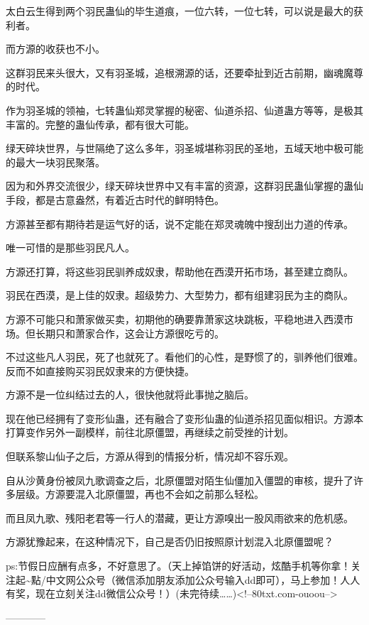 \begin{this_body}
太白云生得到两个羽民蛊仙的毕生道痕，一位六转，一位七转，可以说是最大的获利者。

而方源的收获也不小。

这群羽民来头很大，又有羽圣城，追根溯源的话，还要牵扯到近古前期，幽魂魔尊的时代。

作为羽圣城的领袖，七转蛊仙郑灵掌握的秘密、仙道杀招、仙道蛊方等等，是极其丰富的。完整的蛊仙传承，都有很大可能。

绿天碎块世界，与世隔绝了这么多年，羽圣城堪称羽民的圣地，五域天地中极可能的最大一块羽民聚落。

因为和外界交流很少，绿天碎块世界中又有丰富的资源，这群羽民蛊仙掌握的蛊仙手段，都是古意盎然，有着近古时代的鲜明特色。

方源甚至都有期待若是运气好的话，说不定能在郑灵魂魄中搜刮出力道的传承。

唯一可惜的是那些羽民凡人。

方源还打算，将这些羽民驯养成奴隶，帮助他在西漠开拓市场，甚至建立商队。

羽民在西漠，是上佳的奴隶。超级势力、大型势力，都有组建羽民为主的商队。

方源不可能只和萧家做买卖，初期他的确要靠萧家这块跳板，平稳地进入西漠市场。但长期只和萧家合作，这会让方源很吃亏的。

不过这些凡人羽民，死了也就死了。看他们的心性，是野惯了的，驯养他们很难。反而不如直接购买羽民奴隶来的方便快捷。

方源不是一位纠结过去的人，很快他就将此事抛之脑后。

现在他已经拥有了变形仙蛊，还有融合了变形仙蛊的仙道杀招见面似相识。方源本打算变作另外一副模样，前往北原僵盟，再继续之前受挫的计划。

但联系黎山仙子之后，方源从得到的情报分析，情况却不容乐观。

自从沙黄身份被凤九歌调查之后，北原僵盟对陌生仙僵加入僵盟的审核，提升了许多层级。方源要混入北原僵盟，再也不会如之前那么轻松。

而且凤九歌、残阳老君等一行人的潜藏，更让方源嗅出一股风雨欲来的危机感。

方源犹豫起来，在这种情况下，自己是否仍旧按照原计划混入北原僵盟呢？

ps:节假日应酬有点多，不好意思了。（天上掉馅饼的好活动，炫酷手机等你拿！关注起\~{}點/中文网公众号（微信添加朋友添加公众号输入dd即可），马上参加！人人有奖，现在立刻关注dd微信公众号！）(未完待续……)<!--80txt.com-ouoou-->

------------

\end{this_body}

